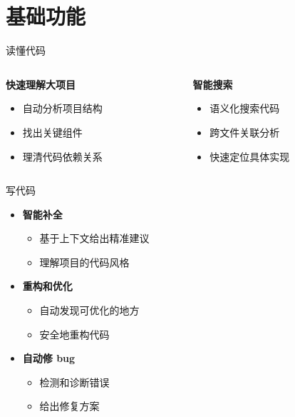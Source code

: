 \documentclass[aspectratio=169,xcolor=dvipsnames]{beamer}
\begin{document}
\section{基础功能}

\begin{frame}{读懂代码}
  \begin{columns}
    \begin{column}{0.48\textwidth}
      \textbf{快速理解大项目}
      \begin{itemize}
        \item 自动分析项目结构
        \item 找出关键组件
        \item 理清代码依赖关系
      \end{itemize}
    \end{column}
    \begin{column}{0.48\textwidth}
      \textbf{智能搜索}
      \begin{itemize}
        \item 语义化搜索代码
        \item 跨文件关联分析
        \item 快速定位具体实现
      \end{itemize}
    \end{column}
  \end{columns}
\end{frame}

\begin{frame}{写代码}
  \begin{itemize}
    \item \textbf{智能补全}
    \begin{itemize}
      \item 基于上下文给出精准建议
      \item 理解项目的代码风格
    \end{itemize}

    \vspace{0.3cm}

    \item \textbf{重构和优化}
    \begin{itemize}
      \item 自动发现可优化的地方
      \item 安全地重构代码
    \end{itemize}

    \vspace{0.3cm}

    \item \textbf{自动修 bug}
    \begin{itemize}
      \item 检测和诊断错误
      \item 给出修复方案
    \end{itemize}
  \end{itemize}
\end{frame}
\end{document}
